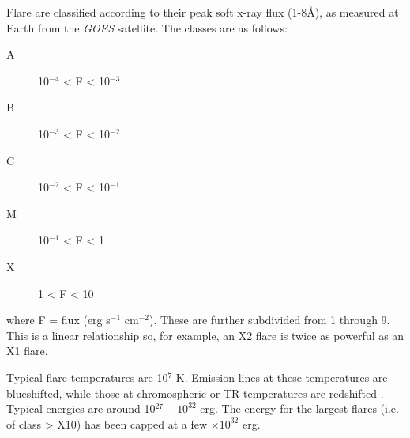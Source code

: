 Flare are classified according to their peak
soft x-ray flux (1-8\AA{}), as
measured at Earth from the \textit{GOES} satellite.
The classes are as follows:
\begin{description}
    \item [A] 10$^{−4}$ < F < 10$^{−3}$
    \item [B] 10$^{−3}$ < F < 10$^{−2}$
    \item [C] 10$^{−2}$ < F < 10$^{−1}$
    \item [M] 10$^{−1}$ < F < 1
    \item [X] 1 < F < 10
\end{description}
where F = flux (erg s$^{-1}$ cm$^{−2}$).
These are further subdivided from 1 through 9.
This is a linear relationship so, for example, an X2 flare is twice as powerful
as an X1 flare.

Typical flare temperatures are 10$^{7}$ K.
Emission lines at these temperatures are blueshifted, while those at
chromospheric or TR temperatures are redshifted
\citep{Brosius2016}.
Typical energies are around 10$^{27}−10^{32}$ erg.
The energy for the largest flares (i.e. of class > X10) has
been capped at a few $\times 10^{32}$ erg.

